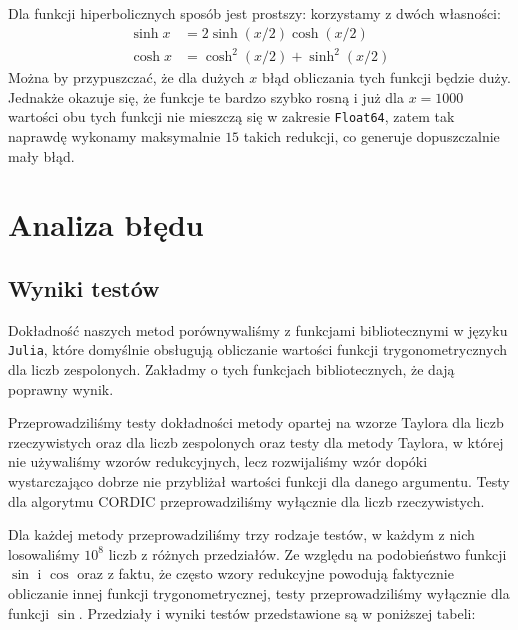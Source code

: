 \documentclass[12pt]{extarticle}
\theoremstyle{remark}
\theoremstyle{definition}
\theoremstyle{definition}
\begin{document}
Dla funkcji hiperbolicznych sposób jest prostszy: korzystamy z dwóch własności:
\begin{align*}
  \sinh x & = 2\sinh(x/2)\cosh(x/2)       \\
  \cosh x & = \cosh^2(x/2) + \sinh^2(x/2)
\end{align*}
Można by przypuszczać, że dla dużych $x$ błąd obliczania tych funkcji będzie duży. Jednakże okazuje się, że funkcje te bardzo szybko rosną i już dla $x = 1000$ wartości obu tych funkcji nie mieszczą się w zakresie \texttt{Float64}, zatem tak naprawdę wykonamy maksymalnie $15$ takich redukcji, co generuje dopuszczalnie mały błąd.

\section{Analiza błędu}

\subsection{Wyniki testów}
Dokładność naszych metod porównywaliśmy z funkcjami bibliotecznymi w języku \texttt{Julia}, które domyślnie obsługują obliczanie wartości funkcji trygonometrycznych dla liczb zespolonych. Zakładmy o tych funkcjach bibliotecznych, że dają poprawny wynik.

Przeprowadziliśmy testy dokładności metody opartej na wzorze Taylora dla liczb rzeczywistych oraz dla liczb zespolonych oraz testy dla metody Taylora, w której nie używaliśmy wzorów redukcyjnych, lecz rozwijaliśmy wzór dopóki wystarczająco dobrze nie przybliżał wartości funkcji dla danego argumentu. Testy dla algorytmu CORDIC przeprowadziliśmy wyłącznie dla liczb rzeczywistych. 

Dla każdej metody przeprowadziliśmy trzy rodzaje testów, w każdym z nich losowaliśmy $10^8$ liczb z różnych przedziałów. Ze względu na podobieństwo funkcji $\sin$ i $\cos$ oraz z faktu, że często wzory redukcyjne powodują faktycznie obliczanie innej funkcji trygonometrycznej, testy przeprowadziliśmy wyłącznie dla funkcji $\sin$. Przedziały i wyniki testów przedstawione są w poniższej tabeli:
\end{document}
